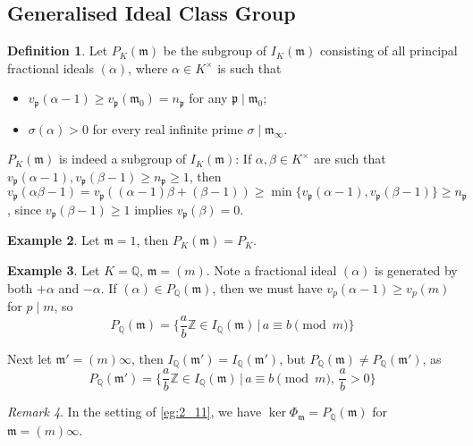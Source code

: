 \documentclass[11pt]{article}
\theoremstyle{definition}
\newtheorem{definition}{Definition}[section]
\newtheorem{example}[definition]{Example}
\theoremstyle{plain}
\theoremstyle{remark}
\newtheorem{remark}[definition]{Remark}
\newcommand{\ZZ}{\mathbb{Z}}
\newcommand{\QQ}{\mathbb{Q}}
\newcommand{\fp}{\mathfrak{p}}
\newcommand{\fm}{\mathfrak{m}}
\begin{document}
\subsection{Generalised Ideal Class Group}

\begin{definition}\label{def:2_12}
    Let $P_K(\fm)$ be the subgroup of $I_K(\fm)$ consisting of all principal fractional ideals $(\alpha)$, where $\alpha \in K^\times$ is such that
    \begin{itemize}
        \item $v_\fp(\alpha - 1) \ge v_\fp(\fm_0) = n_\fp$ for any $\fp \mid \fm_0$;
        \item $\sigma(\alpha) > 0$ for every real infinite prime $\sigma \mid \fm_\infty$.
    \end{itemize}
\end{definition}
{\color{blue}
    $P_K(\fm)$ is indeed a subgroup of $I_K(\fm)$: If $\alpha, \beta \in K^\times$ are such that $v_\fp(\alpha - 1), v_\fp(\beta - 1) \ge n_\fp \ge 1$, then $v_\fp(\alpha \beta - 1) = v_\fp((\alpha - 1)\beta + (\beta - 1)) \ge \min\{v_\fp(\alpha - 1), v_\fp(\beta - 1)\} \ge n_\fp$, since $v_\fp(\beta - 1) \ge 1$ implies $v_\fp(\beta) = 0$.
}

\begin{example}\label{eg:2_13}
    Let $\fm = 1$, then $P_K(\fm) = P_K$.
\end{example}

\begin{example}\label{eg:2_14}
    Let $K = \QQ$, $\fm = (m)$. Note a fractional ideal $(\alpha)$ is generated by both $+\alpha$ and $-\alpha$. If $(\alpha) \in P_\QQ(\fm)$, then we must have $v_p(\alpha - 1) \ge v_p(m)$ for $p \mid m$, so
    \begin{equation*}
        P_\QQ(\fm) = \bigg\{\frac{a}{b}\ZZ \in I_\QQ(\fm) \,\big\vert\, a \equiv b \pmod{m}\bigg\}
    \end{equation*}

    \noindent Next let $\fm' = (m) \infty$, then $I_\QQ(\fm') = I_\QQ(\fm')$, but $P_\QQ(\fm) \neq P_\QQ(\fm')$, as
    \begin{equation*}
        P_\QQ(\fm') = \bigg\{\frac{a}{b}\ZZ \in I_\QQ(\fm) \,\big\vert\, a \equiv b \pmod{m},\, \frac{a}{b} > 0\bigg\}
    \end{equation*}
\end{example}

\begin{remark}\label{remark:2_15}
    In the setting of \autoref{eg:2_11}, we have $\ker \Phi_\fm = P_\QQ(\fm)$ for $\fm = (m) \infty$.
\end{remark}
\end{document}
